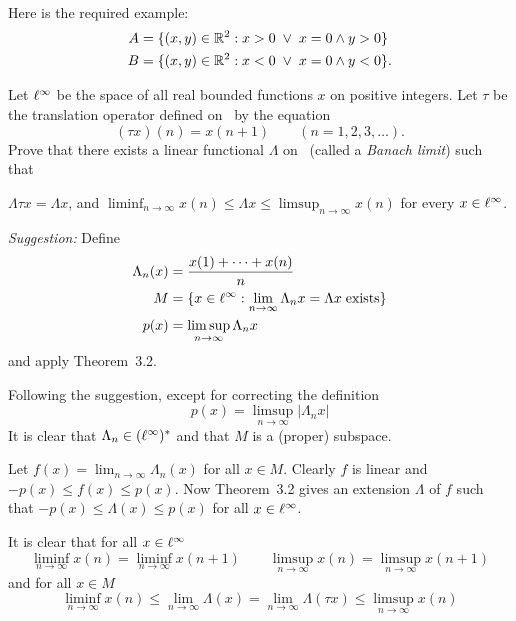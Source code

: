 \begin{enumerate}
\paragraph{}
Here is the required example:
\begin{align*}
A &= \{(x,y)\in\mathbb{R}^2: x>0 \;\vee\; x = 0 \wedge y > 0\} \\
B &= \{(x,y)\in\mathbb{R}^2: x<0 \;\vee\; x = 0 \wedge y < 0\}.
\end{align*}


\begin{excopy}
Let \(\ell^\infty\) be the space of all real bounded functions $x$ on
positive integers. Let \(\tau\) be the translation operator defined on
\ellinf\ by the equation
\begin{equation*}
(\tau x)(n) = x(n+1) \qquad (n=1,2,3,\ldots).
\end{equation*}
Prove that there exists a linear functional \(\Lambda\)
on \ellinf\ (called a
\emph{Banach limit}) such that
\begin{itemize}
 \(\Lambda\tau x = \Lambda x\), and
 \(\liminf_{n\to\infty} x(n) \leq \Lambda x \leq \limsup_{n\to\infty} x(n)\)
 for every \(x\in\ell^\infty\).

\end{itemize}
\emph{Suggestion:} Define
\begin{align*}
\Lambda_n(x) &= \frac{x(1) + \cdots + x(n)}{n} \\
M &= \{x\in\ell^\infty: \lim_{n\to\infty} \Lambda_n x = \Lambda x\;
    \textnormal{exists}\} \\
p(x) &= \limsup_{n\to\infty} \Lambda_n x
\end{align*}
and apply Theorem~3.2.
\end{excopy}

Following the suggestion, except for correcting the definition
\begin{equation*}
p(x) = \limsup_{n\to\infty} |\Lambda_n x|
\end{equation*}
It is clear that \(\Lambda_n\in (\ell^\infty)^*\)
and that $M$ is a (proper) subspace.

Let \(f(x) = \lim_{n\to\infty} \Lambda_n(x)\) for all \(x\in M\).
Clearly $f$ is linear and \(-p(x)\leq f(x) \leq p(x)\).
Now Theorem~3.2 gives an extension \(\Lambda\) of $f$
such that \(-p(x)\leq \Lambda(x) \leq p(x)\) for all \(x\in \ell^\infty\).

It is clear that for all \(x\in \ell^\infty\)
\begin{equation*}
\liminf_{n\to\infty} x(n)
= \liminf_{n\to\infty} x(n+1)
\qquad
 \limsup_{n\to\infty} x(n)
= \limsup_{n\to\infty} x(n+1)
\end{equation*}
and for all \(x\in M\)
\begin{equation*}
\liminf_{n\to\infty} x(n)
 \leq \lim_{n\to\infty}\Lambda(x)
 = \lim_{n\to\infty}\Lambda(\tau x)
 \leq \limsup_{n\to\infty} x(n)
\end{equation*}


\end{enumerate}
